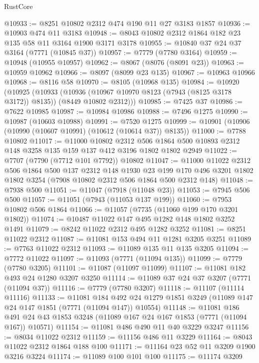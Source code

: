 \begin{lexlean}{RustCore}
\begin{coremodule}
@10933 := @8251 @10802 @2312 @474 @190 @11 @27 @3183 @1857
@10936 := @10903 @474 @11 @3183
@10948 := @8043 @10802 @2312 @1864 @182 @23 @135 @58 @11 @3164 @1900 @3171 @3178
@10955 := @10840 @37 @24 @37 @3164 (@7771 (@10845 @37))
@10957 := @7779 (@7780 @3164)
@10959 := @10948 (@10955 @10957)
@10962 := @8067 (@8076 (@8091 @23))
@10963 := @10959 @10962
@10966 := @8097 (@8099 @23 @135)
@10967 := @10963 @10966
@10968 := @8116 @58
@10970 := @8105 (@10968 @135)
@10984 := @10920
    (@10925
      (@10933
        (@10936 (@10967 @10970 @8123 (@7943 (@8125 @3178 @3172)) @8135))
        (@8449 @10802 @2312)))
@10985 := @7425 @37
@10986 := @7622 @10985
@10987 := @10984 @10986
@10988 := @7496 @1275
@10990 := @10987 (@10603 @10988)
@10991 := @7520 @1275
@10999 := @10901 (@10906 (@10990 (@10607 @10991) (@10612 (@10614 @37)) @8135))
@11000 := @7788 @10802
@11017 := @11000
    @10802
    @2312
    @506
    @1864
    @500
    @10893
    @2312
    @148
    @3258
    @135
    @159
    @137
    @412
    @3196
    @1802
    @1802
    @2949
@11022 := @7707 (@7790 (@7712 @101 @7792)) @10802
@11047 := @11000
    @11022
    @2312
    @506
    @1864
    @500
    @137
    @2312
    @148
    @1930
    @23
    @199
    @170
    @496
    @3201
    @1802
    @1802
    @3254
    (@7908 @10802 @2312 @506 @1864 @500 @2312 @148)
@11048 := @7938 @500
@11051 := @11047 (@7918 (@11048 @23))
@11053 := @7945 @506 @500
@11057 := @11051 (@7943 (@11053 @137 @199))
@11060 := @7953 @10802 @506 @1864
@11066 := @11057 (@7735 (@11060 @199 @170 @3201 @1802))
@11074 := @10487 @11022 @147 @495 @1282 @148 @1802 @3252 @1491
@11079 := @8242 @11022 @2312 @495 @1282 @3252
@11081 := @8251 @11022 @2312
@11087 := @11081 @153 @494 @11 @1281 @3205 @3251
@11089 := @7763 @11022 @2312
@11093 := @11089 @135 @11 @135 @3205
@11094 := @7772 @11022
@11097 := @11093 (@7771 (@11094 @135))
@11099 := @7779 (@7780 @3205)
@11101 := @11087 (@11097 @11099)
@11107 := @11081 @182 @493 @24 @1280 @3207 @3250
@11114 := @11089 @37 @24 @37 @3207 (@7771 (@11094 @37))
@11116 := @7779 (@7780 @3207)
@11118 := @11107 (@11114 @11116)
@11133 := @11081
    @184
    @492
    @24
    @1279
    @1851
    @3249
    (@11089 @147 @24 @147 @1851 (@7771 (@11094 @147)) @10554)
@11148 := @11081
    @186
    @491
    @24
    @43
    @1853
    @3248
    (@11089 @167 @24 @167 @1853 (@7771 (@11094 @167)) @10571)
@11154 := @11081 @486 @490 @11 @40 @3229 @3247
@11156 := @8034 @11022 @2312
@11159 := @11156 @486 @11 @3229
@11164 := @8043 @11022 @2312 @1864 @188 @100
@11171 := @11164 @23 @52 @11 @3209 @1900 @3216 @3224
@11174 := @11089 @100 @101 @100
@11175 := @11174 @3209

\end{coremodule}
\end{lexlean}

